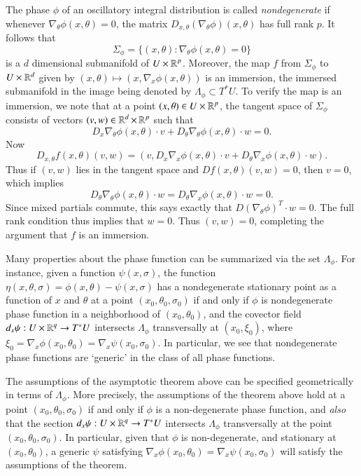 The phase $\phi$ of an oscillatory integral distribution is called \emph{nondegenerate} if whenever $\nabla_\theta \phi(x,\theta) = 0$, the matrix $D_{x,\theta}(\nabla_\theta \phi)(x,\theta)$ has full rank $p$. It follows that
%
\[ \Sigma_\phi = \{ (x,\theta): \nabla_\theta \phi(x,\theta) = 0 \} \]
%
is a $d$ dimensional submanifold of $U \times \operatorname{\mathbb{R}}^p$. Moreover, the map $f$ from $\Sigma_\phi$ to $U \times \operatorname{\mathbb{R}}^d$ given by $(x,\theta) \mapsto (x,\nabla_x \phi(x,\theta))$ is an immersion, the immersed submanifold in the image being denoted by $\Lambda_\phi \subset T^* U$. To verify the map is an immersion, we note that at a point $(x,\theta) \in U \times \operatorname{\mathbb{R}}^p$, the tangent space of $\Sigma_\phi$ consists of vectors $(v,w) \in \operatorname{\mathbb{R}}^d \times \operatorname{\mathbb{R}}^p$ such that
%
\[ D_x \nabla_\theta \phi(x,\theta) \cdot v + D_\theta \nabla_\theta \phi(x,\theta) \cdot w = 0. \]
%
Now
%
\[ D_{x,\theta}f(x,\theta)(v,w) = (v, D_x \nabla_x \phi(x,\theta) \cdot v + D_\theta \nabla_x \phi(x,\theta) \cdot w ). \]
%
Thus if $(v,w)$ lies in the tangent space and $Df(x,\theta)(v,w) = 0$, then $v = 0$, which implies
%
\[ D_\theta \nabla_\theta \phi(x,\theta) \cdot w = D_\theta \nabla_x \phi(x,\theta) \cdot w = 0. \]
%
Since mixed partials commute, this says exactly that $D(\nabla_\theta \phi)^T \cdot w = 0$. The full rank condition thus implies that $w = 0$. Thus $(v,w) = 0$, completing the argument that $f$ is an immersion.

Many properties about the phase function can be summarized via the set $\Lambda_\phi$. For instance, given a function $\psi(x,\sigma)$, the function $\eta(x,\theta,\sigma) = \phi(x,\theta) - \psi(x,\sigma)$ has a nondegenerate stationary point as a function of $x$ and $\theta$ at a point $(x_0,\theta_0,\sigma_0)$ if and only if $\phi$ is nondegenerate phase function in a neighborhood of $(x_0,\theta_0)$, and the covector field $d_x \psi: U \times \operatorname{\mathbb{R}}^q \to T^* U$ intersects $\Lambda_\phi$ transversally at $(x_0,\xi_0)$, where $\xi_0 = \nabla_x \phi(x_0,\theta_0) = \nabla_x \psi(x_0,\sigma_0)$. In particular, we see that nondegenerate phase functions are `generic' in the class of all phase functions.

The assumptions of the asymptotic theorem above can be specified geometrically in terms of $\Lambda_\phi$. More precisely, the assumptions of the theorem above hold at a point $(x_0,\theta_0,\sigma_0)$ if and only if $\phi$ is a non-degenerate phase function, and \emph{also} that the section $d_x \psi: U \times \operatorname{\mathbb{R}}^q \to T^* U$ intersects $\Lambda_\phi$ transversally at the point $(x_0,\theta_0,\sigma_0)$. In particular, given that $\phi$ is non-degenerate, and stationary at $(x_0,\theta_0)$, a generic $\psi$ satisfying $\nabla_x \phi(x_0, \theta_0) = \nabla_x \psi(x_0,\sigma_0)$ will satisfy the assumptions of the theorem.


